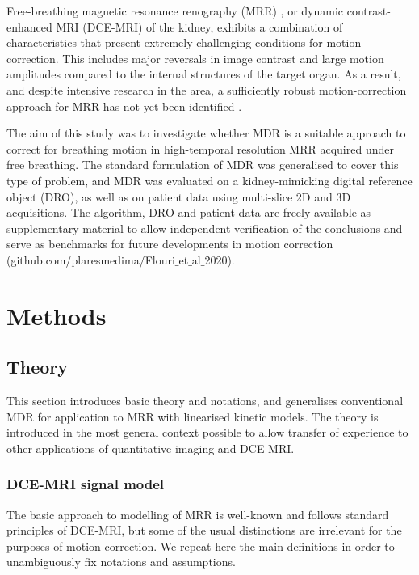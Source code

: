 \documentclass[num-refs]{wiley-article}
\begin{document}
Free-breathing magnetic resonance renography (MRR) \cite{Basak2019}, or dynamic contrast-enhanced MRI (DCE-MRI) of the kidney, exhibits a combination of characteristics that present extremely challenging conditions for motion correction. This includes major reversals in image contrast and large motion amplitudes compared to the internal structures of the target organ. As a result, and despite intensive research in the area, a sufficiently robust motion-correction approach for MRR has not yet been identified \cite{Zollner2020}. 

The aim of this study was to investigate whether MDR is a suitable approach to correct for breathing motion in high-temporal resolution MRR acquired under free breathing. The standard formulation of MDR was generalised to cover this type of problem, and MDR was evaluated on a kidney-mimicking digital reference object (DRO), as well as on patient data using multi-slice 2D and 3D acquisitions. The algorithm, DRO and patient data are freely available as supplementary material to allow independent verification of the conclusions and serve as benchmarks for future developments in motion correction (github.com/plaresmedima/Flouri$\_$et$\_$al$\_$2020).

\section{Methods}

\subsection{Theory}

This section introduces basic theory and notations, and generalises conventional MDR for application to MRR with linearised kinetic models. The theory is introduced in the most general context possible to allow transfer of experience to other applications of quantitative imaging and DCE-MRI.

\subsubsection{DCE-MRI signal model}

The basic approach to modelling of MRR is well-known \cite{Basak2019} and follows standard principles of DCE-MRI, but some of the usual distinctions are irrelevant for the purposes of motion correction. We repeat here the main definitions in order to unambiguously fix notations and assumptions. 
\end{document}
